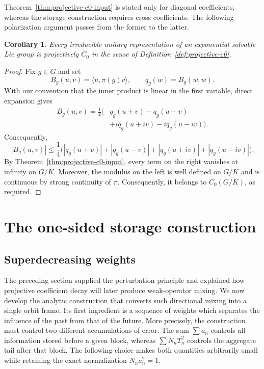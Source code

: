 \documentclass[reqno]{amsart}
\numberwithin{equation}{section}
\newtheorem{corollary}[theorem]{Corollary}
\theoremstyle{definition}
\theoremstyle{remark}
\begin{document}
Theorem~\ref{thm:projective-c0-input} is stated only for diagonal
coefficients, whereas the storage construction requires cross coefficients.
The following polarization argument passes from the former to the latter.

\begin{corollary}\label{cor:cross-c0}
Every irreducible unitary representation of an exponential solvable Lie group is
projectively $C_0$ in the sense of Definition~\ref{def:projective-c0}.
\end{corollary}

\begin{proof}
Fix $g\in G$ and set
\[
 B_g(u,v)=\langle u,\pi(g)v\rangle,
 \qquad q_g(w)=B_g(w,w).
\]
With our convention that the inner product is linear in the first variable,
direct expansion gives
\begin{equation}\label{eq:polarization}
\begin{aligned}
 B_g(u,v)=\frac14\bigl(&q_g(u+v)-q_g(u-v)\\
 &+i q_g(u+iv)-i q_g(u-iv)\bigr).
\end{aligned}
\end{equation}
Consequently,
\[
 |B_g(u,v)|
 \leq\frac14\bigl(
 |q_g(u+v)|+|q_g(u-v)|+|q_g(u+iv)|+|q_g(u-iv)|
 \bigr).
\]
By Theorem~\ref{thm:projective-c0-input}, every term on the right vanishes at
infinity on $G/K$.  Moreover, the modulus on the left is
well defined on $G/K$ and is continuous by strong continuity of $\pi$.
Consequently, it belongs to $C_0(G/K)$, as required.
\end{proof}

\section{The one-sided storage construction}\label{sec:storage}

\subsection{Superdecreasing weights}

The preceding section supplied the perturbation principle and explained how
projective coefficient decay will later produce weak-operator mixing.  We now
develop the analytic construction that converts such directional mixing into
a single orbit frame.  Its first ingredient is a sequence of weights
which separates the influence of the past from that of the future.  More
precisely, the construction must control two different accumulations of error.  The
sum $\sum a_n$ controls all information stored before a given block, whereas
$\sum N_nT_n^2$ controls the aggregate tail after that block.  The following
choice makes both quantities arbitrarily small while retaining the exact
normalization $N_na_n^2=1$.
\end{document}
